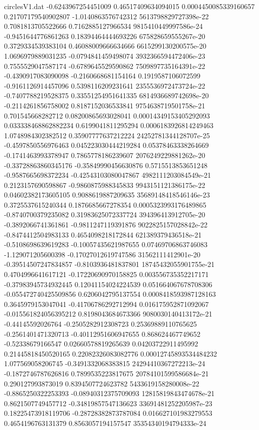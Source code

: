 \begin{filecontents}{circlesV1.dat}
-0.6243967254451009	0.46517409634094015	0.0004450085339160657
0.21707179540902807	-1.0140863576742312	5613798829727398e-22
0.7081813705522666	0.7162885127966534	9815410449997586e-24
-0.9451644776861263	0.18394464444693226	675828659555267e-20
0.3729334539383104	0.46088009666634666	6615299130200575e-20
1.0696979889031235	-0.0794841459498074	3932366594472406e-23
0.7555529047587174	-0.6789645529590862	7509897735164391e-22
-0.4390917083090098	-0.2160668681154164	0.1919587106072599
-0.9161126914457096	0.5398116209231641	2355536972473724e-22
-0.7407788219528375	0.33551254951641335	6814936689742698e-20
-0.2114261856758002	0.8187152036533841	9754638719501758e-21
0.701545668282712	0.08200865693028041	0.00014349153405292093
0.033338468862882234	0.6199041811295294	0.0006183926814249463
1.0748984302382512	0.35907777637212224	24252781344128707e-25
-0.4597850556976463	0.045223030444219284	0.05378463338264669
-0.1741463993378947	0.7865778186239607	2076249229881262e-20
-0.33728863860345176	-0.35849990456630876	0.5715513853651248
-0.9587665698372234	-0.42543103080047867	4982111203084549e-21
0.2123157690598867	-0.9860875988345833	9943151121386175e-22
0.04602382173605105	0.9088619887209635	35689148418546146e-23
0.3725537615240344	0.1876685667278354	0.0005323993176489865
-0.8740700379235082	0.31983625072337724	394396413912705e-20
-0.3892066741361861	-0.9811247119391876	9022825157028842e-22
-0.8474412504983133	0.4654098218172844	621389379436518e-21
-0.5108698639619283	-0.10057435621987655	0.07469706863746083
-1.129071205600398	-0.17027012619747586	31562111412901e-20
-0.39514507247834857	-0.8103936481837801	18745432055901755e-21
0.4704996641617121	-0.17220690970158825	0.003556735352217171
-0.37983945734932445	0.12041154024224539	0.051664067678708306
-0.055472740425509856	0.6206042795137554	0.0008418593987128163
0.3645979153047041	-0.41706786292712994	0.016175952871092067
-0.015561824056395212	0.8198043684673366	9080030140413172e-21
-0.44145592026764	-0.2505282912308723	0.25369889110765625
-0.2561401471320713	-0.40112951606947655	0.868624467749652
-0.52338679166547	0.02660578819265639	0.04203722911495992
0.21445818450520165	0.22082326083082776	0.00012745893534484232
1.077569058206745	-0.3491332068383815	24294410367272213e-24
-0.1872746787626816	0.7899535223817675	20784101599586684e-21
0.290127993873019	0.8394507724623782	5433619158280008e-22
-0.8865250322253393	-0.08940312375709093	12815819843474678e-21
0.8621507749457712	-0.34819857547136623	33691481252205987e-23
0.18225473918119706	-0.28728382873787084	0.016627101983279553
0.4654196763131379	0.8563057194157547	35354340194794333e-24

\end{filecontents}
